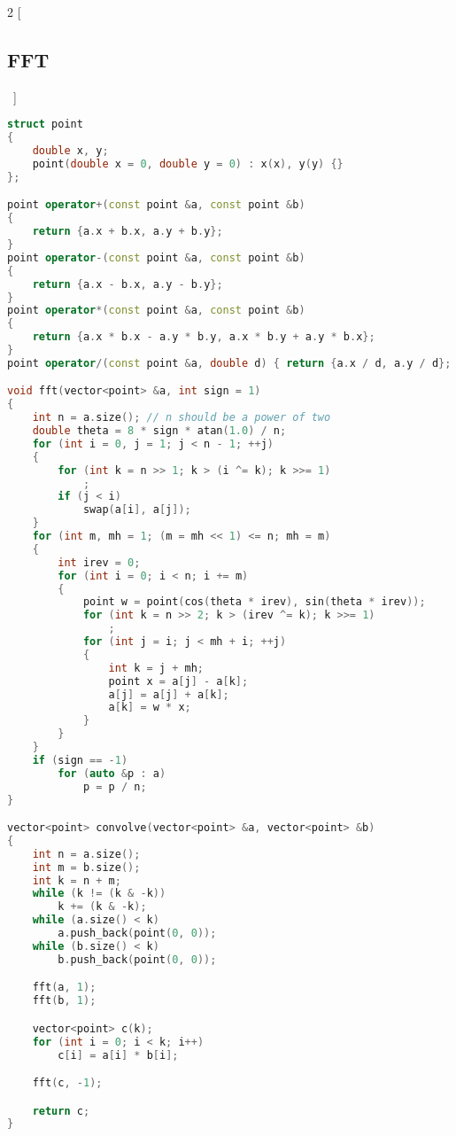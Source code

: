 \documentclass[leter]{amsart}
\begin{document}
\begin{multicols}{2}
[\subsection{FFT}\ ]
\begin{lstlisting}[language=C++]
struct point
{
    double x, y;
    point(double x = 0, double y = 0) : x(x), y(y) {}
};

point operator+(const point &a, const point &b)
{
    return {a.x + b.x, a.y + b.y};
}
point operator-(const point &a, const point &b)
{
    return {a.x - b.x, a.y - b.y};
}
point operator*(const point &a, const point &b)
{
    return {a.x * b.x - a.y * b.y, a.x * b.y + a.y * b.x};
}
point operator/(const point &a, double d) { return {a.x / d, a.y / d}; }

void fft(vector<point> &a, int sign = 1)
{
    int n = a.size(); // n should be a power of two
    double theta = 8 * sign * atan(1.0) / n;
    for (int i = 0, j = 1; j < n - 1; ++j)
    {
        for (int k = n >> 1; k > (i ^= k); k >>= 1)
            ;
        if (j < i)
            swap(a[i], a[j]);
    }
    for (int m, mh = 1; (m = mh << 1) <= n; mh = m)
    {
        int irev = 0;
        for (int i = 0; i < n; i += m)
        {
            point w = point(cos(theta * irev), sin(theta * irev));
            for (int k = n >> 2; k > (irev ^= k); k >>= 1)
                ;
            for (int j = i; j < mh + i; ++j)
            {
                int k = j + mh;
                point x = a[j] - a[k];
                a[j] = a[j] + a[k];
                a[k] = w * x;
            }
        }
    }
    if (sign == -1)
        for (auto &p : a)
            p = p / n;
}

vector<point> convolve(vector<point> &a, vector<point> &b)
{
    int n = a.size();
    int m = b.size();
    int k = n + m;
    while (k != (k & -k))
        k += (k & -k);
    while (a.size() < k)
        a.push_back(point(0, 0));
    while (b.size() < k)
        b.push_back(point(0, 0));

    fft(a, 1);
    fft(b, 1);

    vector<point> c(k);
    for (int i = 0; i < k; i++)
        c[i] = a[i] * b[i];

    fft(c, -1);

    return c;
}


\end{lstlisting}
\end{multicols}
\end{document}
